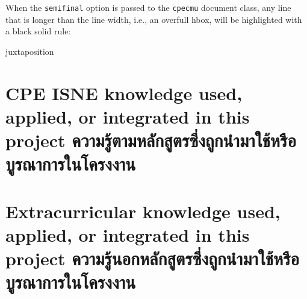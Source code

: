 When the \verb.semifinal. option is passed to the \verb.cpecmu. document class,
any line that is longer than the line width, i.e., an overfull hbox, will be
highlighted with a black solid rule:
\begin{center}
\begin{minipage}{2em}
juxtaposition
\end{minipage}
\end{center}

\section{\ifenglish%
\ifcpe CPE \else ISNE \fi knowledge used, applied, or integrated in this project
\else%
ความรู้ตามหลักสูตรซึ่งถูกนำมาใช้หรือบูรณาการในโครงงาน
\fi
}


\section{\ifenglish%
Extracurricular knowledge used, applied, or integrated in this project
\else%
ความรู้นอกหลักสูตรซึ่งถูกนำมาใช้หรือบูรณาการในโครงงาน
\fi
}

